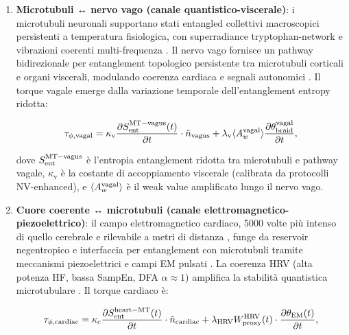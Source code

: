 \documentclass[11pt,a4paper]{article}
\let\oldcite\cite
\renewcommand{\cite}{\protect\oldcite}
\theoremstyle{plain}
\theoremstyle{definition}
\begin{document}
\begin{enumerate}
    \item \textbf{Microtubuli ↔ nervo vago (canale quantistico-viscerale)}: i microtubuli neuronali supportano stati entangled collettivi macroscopici persistenti a temperatura fisiologica, con superradiance tryptophan-network e vibrazioni coerenti multi-frequenza \cite{babcock2024superradiance, wiest2025}. Il nervo vago fornisce un pathway bidirezionale per entanglement topologico persistente tra microtubuli corticali e organi viscerali, modulando coerenza cardiaca e segnali autonomici \cite{mccraty2014coherent}. Il torque vagale emerge dalla variazione temporale dell'entanglement entropy ridotta:

    \begin{equation}
    \tau_{\phi,\text{vagal}} = \kappa_{\text{v}} \frac{\partial S_{\rm ent}^{\rm MT-vagus}(t)}{\partial t} \cdot \hat{n}_{\text{vagus}} + \lambda_{\text{v}} \langle A_w^{\rm vagal} \rangle \frac{\partial \theta_{\rm braid}^{\rm vagal}}{\partial t},
    \label{eq:torque_vagal}
    \end{equation}

    \vspace{0.3cm}

    dove $S_{\rm ent}^{\rm MT-vagus}$ è l'entropia entanglement ridotta tra microtubuli e pathway vagale, $\kappa_{\text{v}}$ è la costante di accoppiamento viscerale (calibrata da protocolli NV-enhanced), e $\langle A_w^{\rm vagal} \rangle$ è il weak value amplificato lungo il nervo vago.

    \item \textbf{Cuore coerente ↔ microtubuli (canale elettromagnetico-piezoelettrico)}: il campo elettromagnetico cardiaco, 5000 volte più intenso di quello cerebrale e rilevabile a metri di distanza \cite{mccraty2004energetic}, funge da reservoir negentropico e interfaccia per entanglement con microtubuli tramite meccanismi piezoelettrici e campi EM pulsati \cite{mccraty2015coherent}. La coerenza HRV (alta potenza HF, bassa SampEn, DFA $\alpha \approx 1$) amplifica la stabilità quantistica microtubulare \cite{heartmath2025coherence}. Il torque cardiaco è:

    \begin{equation}
    \tau_{\phi,\text{cardiac}} = \kappa_{\text{c}} \frac{\partial S_{\rm ent}^{\rm heart-MT}(t)}{\partial t} \cdot \hat{n}_{\text{cardiac}} + \lambda_{\text{HRV}} W_{\rm proxy}^{\rm HRV}(t) \cdot \frac{\partial \theta_{\rm EM}(t)}{\partial t},
    \label{eq:torque_cardiac}
    \end{equation}


\end{enumerate}
\end{document}
